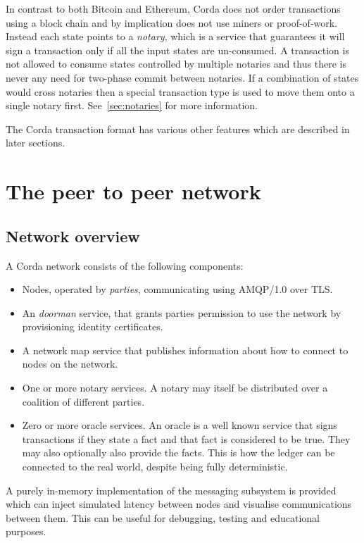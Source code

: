 \documentclass{article}
\begin{document}
In contrast to both Bitcoin and Ethereum, Corda does not order transactions using a block chain and by implication
does not use miners or proof-of-work. Instead each state points to a \emph{notary}, which is a service that
guarantees it will sign a transaction only if all the input states are un-consumed. A transaction is not allowed to
consume states controlled by multiple notaries and thus there is never any need for two-phase commit between
notaries. If a combination of states would cross notaries then a special transaction type is used to move them onto
a single notary first. See~\cref{sec:notaries} for more information.

The Corda transaction format has various other features which are described in later sections.

\section{The peer to peer network}

\subsection{Network overview}
A Corda network consists of the following components:

\begin{itemize}
\item Nodes, operated by \emph{parties}, communicating using AMQP/1.0 over TLS.
\item An \emph{doorman} service, that grants parties permission to use the network by provisioning identity certificates.
\item A network map service that publishes information about how to connect to nodes on the network.
\item One or more notary services. A notary may itself be distributed over a coalition of different parties.
\item Zero or more oracle services. An oracle is a well known service that signs transactions if they state a fact
and that fact is considered to be true. They may also optionally also provide the facts. This is how the ledger can be
connected to the real world, despite being fully deterministic.
\end{itemize}


A purely in-memory implementation of the messaging subsystem is provided which can inject simulated latency between
nodes and visualise communications between them. This can be useful for debugging, testing and educational
purposes.
\end{document}
